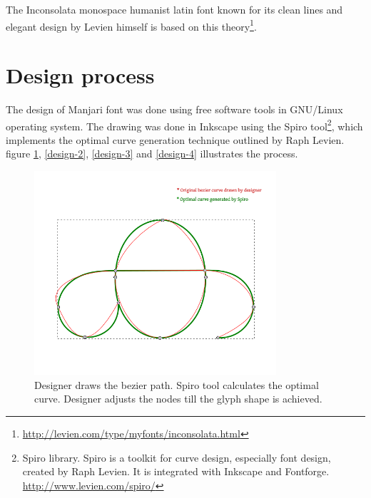 \documentclass[11pt,twoside,a4paper,parskip=half]{scrartcl}
\begin{document}
The Inconsolata monospace humanist latin font known for its clean lines and elegant design by Levien himself is based on this theory\footnote{\url{http://levien.com/type/myfonts/inconsolata.html}}.

\clearpage

\section{Design process}

The design of Manjari font was done using free software tools in GNU/Linux operating system. The drawing was done in Inkscape using the Spiro tool\footnote{Spiro library. Spiro is a toolkit for curve design, especially font design, created by Raph Levien. It is integrated with Inkscape and Fontforge. \url{http://www.levien.com/spiro/}}, which implements the optimal curve generation technique outlined by Raph Levien. figure \ref{design-1}, \ref{design-2}, \ref{design-3} and \ref{design-4} illustrates the process.

\begin{figure}[h!]
	\includegraphics[width=0.8\textwidth]{images/design-1-spiral.png}
	\caption{Designer draws the bezier path. Spiro tool calculates the optimal curve. Designer adjusts the nodes till the glyph shape is achieved.}
	\label{design-1}
\end{figure}
\end{document}
